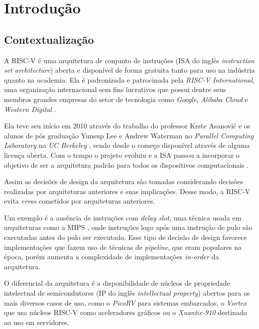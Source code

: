 
\chapter{Introdução}
\label{cap:introducao}

\section{Contextualização}
\label{sec:ic}

A RISC-V é uma arquitetura de conjunto de instruções (ISA do inglês 
\emph{instruction set architecture}) aberta e disponível de forma gratuita 
tanto para uso na indústria quanto na academia. 
Ela é padronizada e patrocinada pela \emph{RISC-V International}, uma organização 
internacional sem fins lucrativos que possui dentre seus membros grandes 
empresas do setor de tecnologia como \emph{Google}, \emph{Alibaba Cloud} e 
\emph{Western Digital} \citep{MEM}.

Ela teve seu início em 2010 através do trabalho do professor Krste Asanović e os 
alunos de pós graduação Yunsup Lee e Andrew Waterman no \emph{Parallel Computing
Laboratory} na \emph{UC Berkeley} \citep{RVH}, sendo desde o começo disponível 
através de alguma licença aberta. Com o tempo o projeto evoluiu e a ISA passou 
a incorporar o objetivo de ser a arquitetura padrão para todos os dispositivos 
computacionais \citep{Asanović:EECS-2014-146}.

Assim as decisões de design da arquitetura são tomadas considerando decisões 
realizadas por arquiteturas anteriores e suas implicações. Desse modo, a RISC-V
evita \emph{erros} cometidos por arquiteturas anteriores.

Um exemplo é a ausência de instruções com \emph{delay slot}, uma técnica usada 
em arquiteturas como a MIPS \citep{DSTL}, onde instruções logo após uma instrução
de pulo são executadas antes do pulo ser executado. Esse tipo de decisão de design
favorece implementações que fazem uso de técnicas de \emph{pipeline}, que eram
populares na época, porém aumenta a complexidade de implementações \emph{in-order} 
da arquitetura.

O diferencial da arquitetura é a disponibilidade de núcleos de propriedade intelectual
de semicondutores (IP do inglês \emph{intellectual property}) abertos para os mais 
diversos casos de uso, como o \emph{PicoRV} \citep{PICO} para sistemas embarcados, 
o \emph{Vortex} \citep{elsabbagh2020vortex} que usa núcleos RISC-V como aceleradores 
gráficos ou o \emph{Xuantie-910} \citep{9138983} destinado ao uso em servidores.

